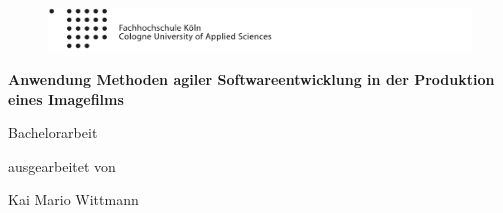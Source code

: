 \begin{titlepage}

\begin{center}

\begin{figure}[!ht]
  \centering
    \includegraphics[natwidth=920pt, natheight=95pt, width=1.0\textwidth]{images/logoheader.pdf}
\end{figure}

\vspace{0.8cm}

\begin{rmfamily}
\begin{huge}
\textbf{Anwendung Methoden agiler Softwareentwicklung in der Produktion eines Imagefilms}\\ 
\end{huge}
\vspace{0.5cm}
\end{rmfamily}

\vspace{1.6cm}



\begin{LARGE}
\begin{scshape}
Bachelorarbeit\\[0.8em]
\end{scshape}
\end{LARGE}

\begin{large}
ausgearbeitet von\\ 
\vspace{0.2cm}
\begin{LARGE}
Kai Mario Wittmann\\
\end{LARGE}
\end{large}


\end{center}
\end{titlepage}
